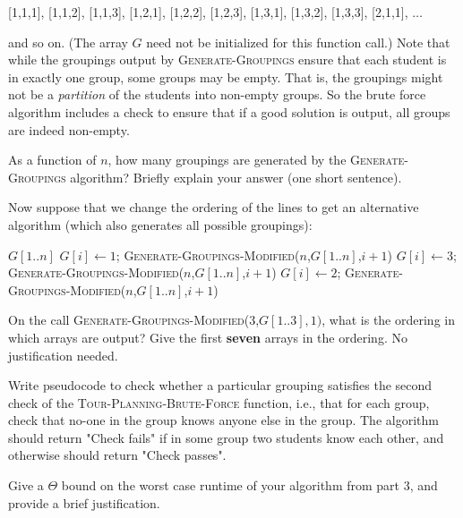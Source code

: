 \documentclass[11pt,fleqn]{exam}
\newif\ifsolutions\solutionsfalse
\begin{document}
\vspace{.1in}

\hspace{.5in} [1,1,1], [1,1,2], [1,1,3], [1,2,1], [1,2,2], [1,2,3], [1,3,1], [1,3,2], [1,3,3], [2,1,1], $\ldots$

\vspace{.1in}

\noindent
and so on. (The array $G$ need not be initialized for this function call.)  Note that while the groupings output by \textsc{Generate-Groupings} ensure that each student is in exactly one group, some groups may be empty. That is, the groupings might not be a {\em partition} of the students into non-empty groups.  So the brute force algorithm includes a check to ensure that if a good solution is output, all groups are indeed non-empty.


\begin{questions}
\question[2]
As a function of $n$, how many groupings are generated by the \textsc{Generate-Groupings} algorithm? Briefly explain your answer (one short sentence).

\ifsolutions

\fi

\question[3]
Now suppose that we change the ordering of the lines to get an alternative algorithm (which also generates all possible groupings):

\begin{algorithmic}
    \Return $G[1..n]$
\Else
   \State $G[i] \gets 1$; \textsc{Generate-Groupings-Modified}($n$,$G[1..n]$,$i+1$)
   \State $G[i] \gets 3$; \textsc{Generate-Groupings-Modified}($n$,$G[1..n]$,$i+1$)
   \State $G[i] \gets 2$; \textsc{Generate-Groupings-Modified}($n$,$G[1..n]$,$i+1$)
\EndIf
   \EndFunction
\end{algorithmic}
On the call \textsc{Generate-Groupings-Modified}(3,$G[1..3],1)$,
what is the ordering in which arrays are output?
Give the first {\bf seven} arrays in the ordering. No justification needed.

\ifsolutions

\fi

\question[4]
Write pseudocode to check whether a particular grouping satisfies the second check of the \textsc{Tour-Planning-Brute-Force} function, i.e., that for each group, check that no-one in the group knows anyone else in the group. The algorithm should return "Check fails" if in some group two students know each other, and otherwise should return "Check passes".

\ifsolutions

\else
\begin{algorithmic}
\State
\State
\EndFunction
\end{algorithmic}
\fi
\question[2]
Give a $\Theta$ bound on the worst case runtime of your algorithm from part 3, and provide a brief justification. 

   \ifsolutions
    
\fi
\end{questions}
\end{document}
